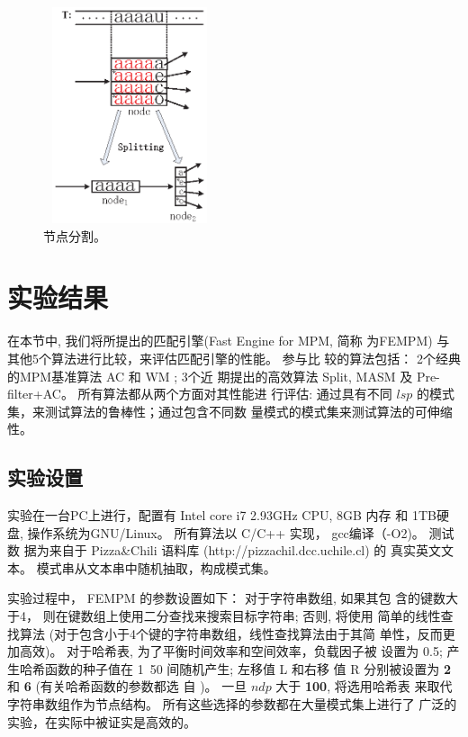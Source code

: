 \begin{figure}[!h]
  \centering
  \includegraphics[height=2.5in, width=2in]{figures/2_MPM/node_split}
  \caption{节点分割。}
  \label{fig:split}
\end{figure}

\section{实验结果}
\label{sec:experiments}

在本节中, 我们将所提出的匹配引擎(Fast Engine for MPM, 简称
为\textsf{FEMPM}) 与其他5个算法进行比较，来评估匹配引擎的性能。 参与比
较的算法包括： 2个经典的MPM基准算法 \textsf{AC} 和 \textsf{WM} ; 3个近
期提出的高效算法 \textsf{Split},
\textsf{MASM} 及 \textsf{Pre-filter+AC}。 所有算法都从两个方面对其性能进
行评估: 通过具有不同 $lsp$ 的模式集，来测试算法的鲁棒性；通过包含不同数
量模式的模式集来测试算法的可伸缩性。

\subsection{实验设置}


实验在一台PC上进行，配置有 Intel core i7 2.93GHz CPU, 8GB 内存 和 1TB硬
盘, 操作系统为GNU/Linux。 所有算法以 C/C++ 实现， gcc编译（-O2)。 测试数
据为来自于 Pizza\;\&\;Chili 语料库 (http://pizzachil.dcc.uchile.cl) 的
真实英文文本。 模式串从文本串中随机抽取，构成模式集。

实验过程中， \textsf{FEMPM} 的参数设置如下： 对于字符串数组, 如果其包
含的键数大于4， 则在键数组上使用二分查找来搜索目标字符串; 否则, 将使用
简单的线性查找算法 (对于包含小于4个键的字符串数组，线性查找算法由于其简
单性，反而更加高效)。 对于哈希表, 为了平衡时间效率和空间效率，负载因子被
设置为 {0.5}; 产生哈希函数的种子值在 1~50 间随机产生; 左移值 L 和右移
值 R 分别被设置为 \textbf{2} 和 \textbf{6} (有关哈希函数的参数都选
自 \cite{Ramakrishna1997})。 一旦 $ndp$ 大于 \textbf{100}, 将选用哈希表
来取代字符串数组作为节点结构。 所有这些选择的参数都在大量模式集上进行了
广泛的实验，在实际中被证实是高效的。

